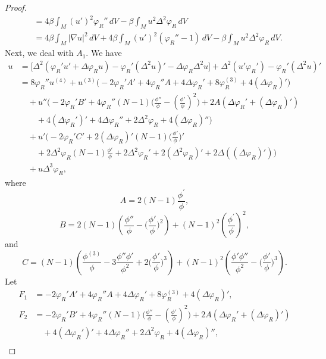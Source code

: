 \documentclass[10pt,leqno]{amsart}
\numberwithin{equation}{section}
\begin{document}
\begin{proof}
\begin{align*}
&= 4\beta \int_{M} (u')^2 \varphi_R ''\, dV-\beta \int_{M} u^2  \Delta^2 \varphi_R\, dV\\
&=4\beta \int_{M} |\nabla u|^2\, dV+ 4\beta \int_M (u')^2 (\varphi_R'' -1 )\,dV -\beta \int_{M} u^2  \Delta^2 \varphi_R\, dV . 
\end{align*}
Next, we deal with $A_1$. We have
\begin{align*}
[\Delta^2 , i\Gamma_{\varphi_R}] u
&=\big[\Delta^2  (\varphi_R ' u' +\Delta \varphi_R u) -\varphi_R ' (\Delta^2 u)' - \Delta \varphi_R \Delta^2 u\big]+\Delta^2 (u' \varphi_R') -  \varphi_R' (\Delta^2 u)'\\
&=8 \varphi_R '' u^{(4)} + u^{(3)} \big(-2\varphi_R' A' +4\varphi_R'' A +4 \Delta \varphi_R ' +8 \varphi_R^{(3)} +4 (\Delta \varphi_R)' \big)\\
&\quad + u'' \Big(- 2\varphi_R' B' +4 \varphi_R '' (N-1) \big(\frac{\phi''}{\phi} - (\frac{\phi'}{\phi})^2 \big) +2A (\Delta \varphi_R ' + (\Delta \varphi_R)' ) \\
&\qquad + 4(\Delta \varphi_R')' +4\Delta \varphi_R '' +2 \Delta^2 \varphi_R +4 (\Delta \varphi_R)'' \Big)\\
&\quad +u' \Big(-2\varphi_R' C' +2(\Delta \varphi_R)' (N-1) \big(\frac{\phi'}{\phi}\big)'\\
&\qquad +2 \Delta^2 \varphi_R (N-1)\frac{\phi'}{\phi}+2\Delta^2 \varphi_R' +2 (\Delta^2 \varphi_R)'  +2 \Delta ( (\Delta \varphi_R)' ) \Big)\\
&\quad + u \Delta^3 \varphi_R ,
\end{align*}
where $$A= 2(N-1)\frac{\phi^\prime}{\phi},$$
$$B=2(N-1) \left(\frac{\phi''}{\phi}- \big(\frac{\phi'}{\phi}\big)^2 \right)+ (N-1)^2 \left(\frac{\phi^\prime}{\phi}\right)^2 , $$
and
$$C= (N-1) \left(\frac{\phi^{(3)}}{\phi}-3\frac{\phi'' \phi'}{\phi^2}+2 \big(\frac{\phi'}{\phi}\big)^3 \right)+ (N-1)^2 \left( \frac{\phi' \phi''}{\phi^2} - \big(\frac{\phi'}{\phi}\big)^3 \right) .$$
Let
\begin{align*}
F_1 &= -2\varphi_R' A' +4\varphi_R'' A +4 \Delta \varphi_R ' +8 \varphi_R^{(3)} +4 (\Delta \varphi_R)' ,\\
F_2 &= - 2\varphi_R' B' +4 \varphi_R '' (N-1) \big(\frac{\phi''}{\phi} - (\frac{\phi'}{\phi})^2 \big) +2A (\Delta \varphi_R ' + (\Delta \varphi_R)' )\\
&\quad + 4(\Delta \varphi_R')' +4\Delta \varphi_R '' +2 \Delta^2 \varphi_R +4 (\Delta \varphi_R)'' ,\\

\end{align*}
\end{proof}
\end{document}
